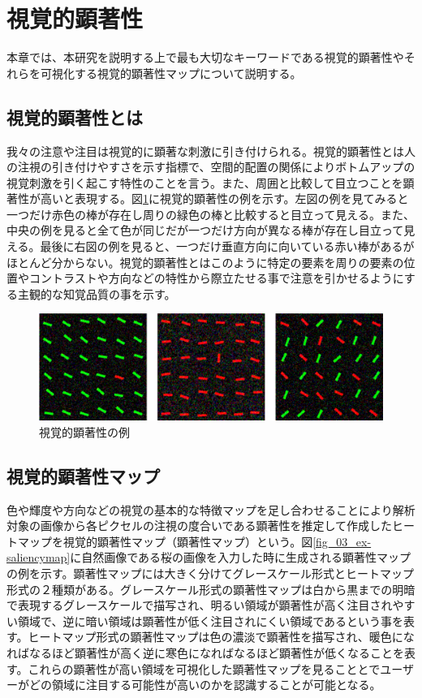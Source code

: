 \newpage
\renewcommand{\baselinestretch}{1.5}
\section{視覚的顕著性}\label{sec:visula_saliency}
\renewcommand{\baselinestretch}{1}
\par 本章では、本研究を説明する上で最も大切なキーワードである視覚的顕著性やそれらを可視化する視覚的顕著性マップについて説明する。

\subsection{視覚的顕著性とは}
\par 我々の注意や注目は視覚的に顕著な刺激に引き付けられる。視覚的顕著性とは人の注視の引き付けやすさを示す指標で、空間的配置の関係によりボトムアップの視覚刺激を引く起こす特性のことを言う。また、周囲と比較して目立つことを顕著性が高いと表現する。図\ref{fig_whats-saliency}に視覚的顕著性の例を示す。左図の例を見てみると一つだけ赤色の棒が存在し周りの緑色の棒と比較すると目立って見える。また、中央の例を見ると全て色が同じだが一つだけ方向が異なる棒が存在し目立って見える。最後に右図の例を見ると、一つだけ垂直方向に向いている赤い棒があるがほとんど分からない。視覚的顕著性とはこのように特定の要素を周りの要素の位置やコントラストや方向などの特性から際立たせる事で注意を引かせるようにする主観的な知覚品質の事を示す\cite{Itti:2007}。

\begin{figure}[H]
    \centering
    \includegraphics[width=12cm]{figures/whats-saliency.png}
    \caption{視覚的顕著性の例\cite{Itti:2007}}
    \label{fig_whats-saliency}
\end{figure}

\subsection{視覚的顕著性マップ}\label{subsec:saliency_map}
\par 色や輝度や方向などの視覚の基本的な特徴マップを足し合わせることにより解析対象の画像から各ピクセルの注視の度合いである顕著性を推定して作成したヒートマップを視覚的顕著性マップ（顕著性マップ）という。図\ref{fig_03_ex-saliencymap}に自然画像である桜の画像を入力した時に生成される顕著性マップの例を示す。顕著性マップには大きく分けてグレースケール形式とヒートマップ形式の２種類がある。グレースケール形式の顕著性マップは白から黒までの明暗で表現するグレースケールで描写され、明るい領域が顕著性が高く注目されやすい領域で、逆に暗い領域は顕著性が低く注目されにくい領域であるという事を表す。ヒートマップ形式の顕著性マップは色の濃淡で顕著性を描写され、暖色になればなるほど顕著性が高く逆に寒色になればなるほど顕著性が低くなることを表す。これらの顕著性が高い領域を可視化した顕著性マップを見ることとでユーザーがどの領域に注目する可能性が高いのかを認識することが可能となる。

